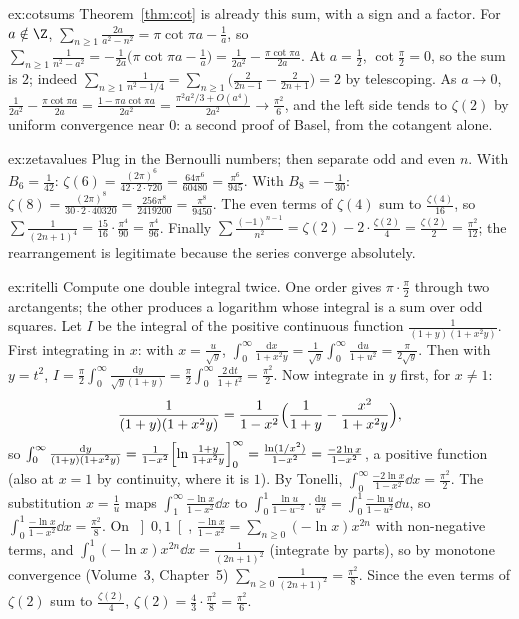 \begin{solution}{ex:cotsums}
\idea Theorem~\ref{thm:cot} is already this sum, with a sign and a factor.
\writeup For $a\notin\Z$, $\sum_{n\ge1}\frac{2a}{a^2-n^2}=\pi\cot\pi a-\frac1a$, so
$\sum_{n\ge1}\frac1{n^2-a^2}=-\frac1{2a}\bigl(\pi\cot\pi a-\frac1a\bigr)=\frac1{2a^2}-\frac{\pi\cot\pi a}{2a}$. At $a=\frac12$, $\cot\frac\pi2=0$, so the sum is
$2$; indeed $\sum_{n\ge1}\frac1{n^2-1/4}=\sum_{n\ge1}\bigl(\frac2{2n-1}-\frac2{2n+1}\bigr)=2$ by telescoping. As $a\to0$,
$\frac1{2a^2}-\frac{\pi\cot\pi a}{2a}=\frac{1-\pi a\cot\pi a}{2a^2}=\frac{\pi^2a^2/3+O(a^4)}{2a^2}\to\frac{\pi^2}6$, and the left side tends to
$\zeta(2)$ by uniform convergence near $0$: a second proof of Basel, from the cotangent alone.
\end{solution}

\begin{solution}{ex:zetavalues}
\idea Plug in the Bernoulli numbers; then separate odd and even $n$.
\writeup With $B_6=\frac1{42}$: $\zeta(6)=\frac{(2\pi)^6}{42\cdot2\cdot720}=\frac{64\pi^6}{60480}=\frac{\pi^6}{945}$. With $B_8=-\frac1{30}$:
$\zeta(8)=\frac{(2\pi)^8}{30\cdot2\cdot40320}=\frac{256\pi^8}{2419200}=\frac{\pi^8}{9450}$. The even terms of $\zeta(4)$ sum to $\frac{\zeta(4)}{16}$, so
$\sum\frac1{(2n+1)^4}=\frac{15}{16}\cdot\frac{\pi^4}{90}=\frac{\pi^4}{96}$. Finally $\sum\frac{(-1)^{n-1}}{n^2}=\zeta(2)-2\cdot\frac{\zeta(2)}4=\frac{\zeta(2)}2=\frac{\pi^2}{12}$;
the rearrangement is legitimate because the series converge absolutely.
\end{solution}

\begin{solution}{ex:ritelli}
\idea Compute one double integral twice. One order gives $\pi\cdot\frac\pi2$ through two arctangents; the other produces a
logarithm whose integral is a sum over odd squares.
\writeup Let $I$ be the integral of the positive continuous function $\frac1{(1+y)(1+x^2y)}$. First integrating in $x$: with
$x=\frac u{\sqrt y}$, $\int_0^\infty\frac{\mathrm dx}{1+x^2y}=\frac1{\sqrt y}\int_0^\infty\frac{\mathrm du}{1+u^2}=\frac\pi{2\sqrt y}$. Then with $y=t^2$,
$I=\frac\pi2\int_0^\infty\frac{\mathrm dy}{\sqrt y(1+y)}=\frac\pi2\int_0^\infty\frac{2\,\mathrm dt}{1+t^2}=\frac{\pi^2}2$. Now integrate in $y$ first, for $x\ne1$:
\[
\frac1{(1+y)(1+x^2y)}=\frac1{1-x^2}\Bigl(\frac1{1+y}-\frac{x^2}{1+x^2y}\Bigr),
\]
so $\int_0^\infty\frac{\mathrm dy}{(1+y)(1+x^2y)}=\frac1{1-x^2}\Bigl[\ln\frac{1+y}{1+x^2y}\Bigr]_0^\infty=\frac{\ln(1/x^2)}{1-x^2}=\frac{-2\ln x}{1-x^2}$, a
positive function (also at $x=1$ by continuity, where it is $1$). By Tonelli, $\int_0^\infty\frac{-2\ln x}{1-x^2}\dd x=\frac{\pi^2}2$. The
substitution $x=\frac1u$ maps $\int_1^\infty\frac{-\ln x}{1-x^2}\dd x$ to $\int_0^1\frac{\ln u}{1-u^{-2}}\cdot\frac{\mathrm du}{u^2}=\int_0^1\frac{-\ln u}{1-u^2}\dd u$, so
$\int_0^1\frac{-\ln x}{1-x^2}\dd x=\frac{\pi^2}8$. On $\left]0,1\right[$, $\frac{-\ln x}{1-x^2}=\sum_{n\ge0}(-\ln x)x^{2n}$ with non-negative terms, and
$\int_0^1(-\ln x)x^{2n}\dd x=\frac1{(2n+1)^2}$ (integrate by parts), so by monotone convergence (Volume~3, Chapter~5)
$\sum_{n\ge0}\frac1{(2n+1)^2}=\frac{\pi^2}8$. Since the even terms of $\zeta(2)$ sum to $\frac{\zeta(2)}4$, $\zeta(2)=\frac43\cdot\frac{\pi^2}8=\frac{\pi^2}6$.
\end{solution}

